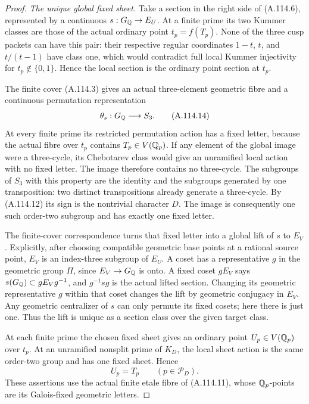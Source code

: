\begin{proof}
\emph{The unique global fixed sheet.}
Take a section in the right side of
(A.114.6), represented by a continuous
$s:G_\mathbb Q\to E_U$.
At a finite prime its two Kummer classes
are those of the actual ordinary point
$t_p=f(T_p)$.
None of the three cusp packets can have
this pair: their respective regular
coordinates $1-t$, $t$, and $t/(t-1)$
have class one, which would contradict
full local Kummer injectivity for
$t_p\notin\{0,1\}$.
Hence the local section is the ordinary
point section at $t_p$.

The finite cover (A.114.3) gives an actual
three-element geometric fibre and a
continuous permutation representation
\[
                \theta_s:G_\mathbb Q\longrightarrow S_3.
\tag{A.114.14}
\]
At every finite prime its restricted
permutation action has a fixed letter,
because the actual fibre over $t_p$
contains $T_p\in V(\mathbb Q_p)$.
If any element of the global image were
a three-cycle, its Chebotarev class
would give an unramified local action
with no fixed letter.
The image therefore contains no
three-cycle.
The subgroups of $S_3$ with this property
are the identity and the subgroups
generated by one transposition:
two distinct transpositions already
generate a three-cycle.
By (A.114.12) its sign is the nontrivial
character $D$.
The image is consequently one such
order-two subgroup and has exactly
one fixed letter.

The finite-cover correspondence turns
that fixed letter into a global lift
of $s$ to $E_V$.
Explicitly, after choosing compatible
geometric base points at a rational
source point, $E_V$ is an
index-three subgroup of $E_U$.
A coset has a representative $g$
in the geometric group $\Pi$, since
$E_V\to G_\mathbb Q$ is onto.
A fixed coset $gE_V$ says
$s(G_\mathbb Q)\subset gE_Vg^{-1}$, and
$g^{-1}sg$ is the actual lifted section.
Changing its geometric representative
$g$ within that coset changes
the lift by geometric conjugacy in
$E_V$.
Any geometric centralizer of $s$ can
only permute its fixed cosets; here
there is just one.
Thus the lift is unique as a section
class over the given target class.

At each finite prime the chosen fixed
sheet gives an ordinary point
$U_p\in V(\mathbb Q_p)$ over $t_p$.
At an unramified nonsplit prime of
$K_D$, the local sheet action is the
same order-two group and has one
fixed sheet.  Hence
\[
                         U_p=T_p
                                   \qquad(p\in\mathcal P_D).
\tag{A.114.15}
\]
These assertions use the actual finite
etale fibre of (A.114.11), whose
$\mathbb Q_p$-points are its Galois-fixed
geometric letters.


\end{proof}
